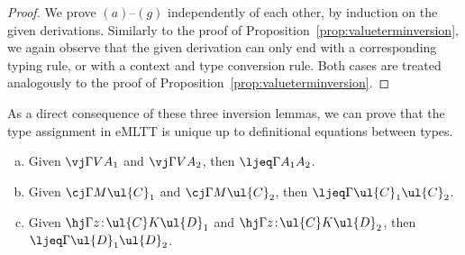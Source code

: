 \begin{proof}
We prove $(a)$--$(g)$ independently of each other, by induction on the given derivations. Similarly to the proof of Proposition~\ref{prop:valueterminversion}, we again observe that the given derivation can  only end with a corresponding typing rule, or with a context and type conversion rule. Both cases are treated analogously to the proof of Proposition~\ref{prop:valueterminversion}.
\end{proof}

As a direct consequence of these three inversion lemmas, we can prove that the type assignment in eMLTT is unique up to definitional equations between types.

\pagebreak

\begin{proposition} \mbox{}
\label{prop:uniquenessoftypeassignement}
\begin{enumerate}[(a)]
\item Given $\vj \Gamma V A_1$ and $\vj \Gamma V A_2$, then $\ljeq \Gamma {A_1} {A_2}$.
\item Given $\cj \Gamma M \ul{C}_1$ and $\cj \Gamma M \ul{C}_2$, then $\ljeq \Gamma {\ul{C}_1} {\ul{C}_2}$.
\item Given $\hj \Gamma {z \!:\! \ul{C}} K \ul{D}_1$ and $\hj \Gamma {z \!:\! \ul{C}} K \ul{D}_2$, then $\ljeq \Gamma {\ul{D}_1} {\ul{D}_2}$.
\end{enumerate}
\end{proposition}

